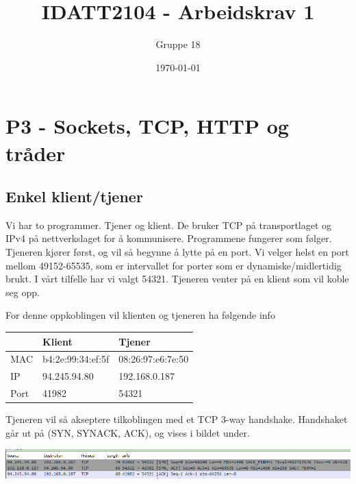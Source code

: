 \documentclass[12pt]{article}
\title{IDATT2104 - Arbeidskrav 1}
\author{Gruppe 18}
\date{\today}
\begin{document}
    \maketitle
    \newpage

    \tableofcontents

    \newpage

    \section{P3 - Sockets, TCP, HTTP og tråder}
    \subsection{Enkel klient/tjener}
    Vi har to programmer. Tjener og klient. De bruker TCP på transportlaget og 
    IPv4 på nettverkslaget for å kommunisere. Programmene fungerer som følger.
    Tjeneren kjører først, og vil så begynne å lytte på en port.
    Vi velger helst en port mellom 49152-65535, som er intervallet for porter som er 
    dynamiske/midlertidig brukt. I vårt tilfelle har vi valgt 54321. Tjeneren venter 
    på en klient som vil koble seg opp.
    
    For denne oppkoblingen vil klienten og tjeneren ha følgende info

    \begin{center}
        \begin{tabular}{|l|l|l|}
            \hline
                 & Klient            & Tjener            \\ \hline
            MAC  & b4:2e:99:34:ef:5f & 08:26:97:e6:7e:50 \\ \hline
            IP   & 94.245.94.80      & 192.168.0.187     \\ \hline
            Port & 41982             & 54321             \\ \hline
        \end{tabular}
    \end{center}
    
    Tjeneren vil så akseptere tilkoblingen med et 
    TCP 3-way handshake. Handshaket går ut på (SYN, SYNACK, ACK), og vises i bildet under.

    \begin{center}
        \includegraphics[width=\linewidth]{assets/9GhtNDG.png}
    \end{center}
    
\end{document}
